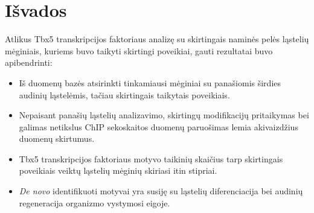 \documentclass[12pt]{article}
\begin{document}
\newpage


\section{Išvados}
Atlikus Tbx5 transkripcijos faktoriaus analizę su skirtingais naminės pelės
ląstelių mėginiais, kuriems buvo taikyti skirtingi poveikiai, gauti rezultatai
buvo apibendrinti:

\begin{itemize}
    \item Iš duomenų bazės atsirinkti tinkamiausi mėginiai su panašiomis
        širdies audinių ląstelėmis, tačiau skirtingais taikytais poveikiais.
    \item Nepaisant panašių ląstelių analizavimo, skirtingų modifikacijų
        pritaikymas bei galimas netikslus ChIP sekoskaitos duomenų paruošimas
        lemia akivaizdžius duomenų skirtumus.
    \item Tbx5 transkripcijos faktoriaus motyvo taikinių skaičius tarp
        skirtingais poveikiais veiktų ląstelių mėginių skiriasi itin stipriai.
    \item \emph{De novo} identifikuoti motyvai yra susiję su ląstelių
        diferenciacija bei audinių regeneracija organizmo vystymosi eigoje.
\end{itemize}

\newpage

\end{document}
